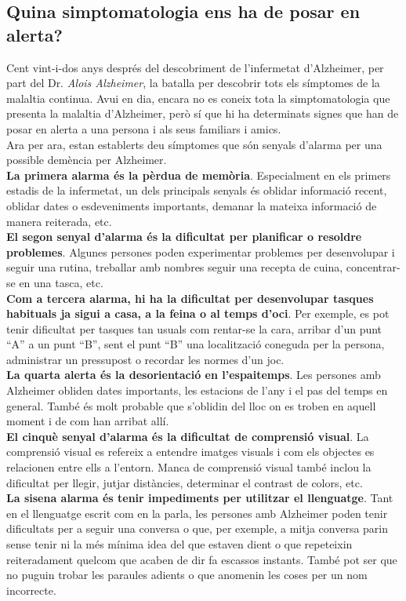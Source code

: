 \documentclass[a4paper,12pt]{article}
\begin{document}
\subsection*{Quina simptomatologia ens ha de posar en alerta?}
Cent vint-i-dos anys després del descobriment de l'infermetat d'Alzheimer, per part del Dr. \textit{Alois Alzheimer}, la batalla per descobrir tots els símptomes de la malaltia continua. Avui en dia, encara no es coneix tota la simptomatologia que presenta la malaltia d'Alzheimer, però sí que hi ha determinats signes que han de posar en alerta a una persona i als seus familiars i amics.\\
Ara per ara, estan establerts deu símptomes que són senyals d'alarma per una possible demència per Alzheimer.\\
\textbf{La primera alarma és la pèrdua de memòria}. Especialment en els primers estadis de la infermetat, un dels principals senyals és oblidar informació recent, oblidar dates o esdeveniments importants, demanar la mateixa informació de manera reiterada, etc.\\
\textbf{El segon senyal d'alarma és la dificultat per planificar o resoldre problemes}. Algunes persones poden experimentar problemes per desenvolupar i seguir una rutina, treballar amb nombres seguir una recepta de cuina, concentrar-se en una tasca, etc.\\
\textbf{Com a tercera alarma, hi ha la dificultat per desenvolupar tasques habituals ja sigui a casa, a la feina o al temps d'oci}. Per exemple, es pot tenir dificultat per tasques tan usuals com rentar-se la cara, arribar d'un punt “A” a un punt “B”, sent el punt “B” una localització coneguda per la persona, administrar un pressupost o recordar les normes d'un joc.\\
\textbf{La quarta alerta és la desorientació en l'espaitemps}. Les persones amb Alzheimer obliden dates importants, les estacions de l'any i el pas del temps en general. També és molt probable que s'oblidin del lloc on es troben en aquell moment i de com han arribat allí.\\
\textbf{El cinquè senyal d'alarma és la dificultat de comprensió visual}. La comprensió visual es refereix a entendre imatges visuals i com els objectes es relacionen entre ells a l'entorn. Manca de comprensió visual també inclou la dificultat per llegir, jutjar distàncies, determinar el contrast de colors, etc.\\
\textbf{La sisena alarma és tenir impediments per utilitzar el llenguatge}. Tant en el llenguatge escrit com en la parla, les persones amb Alzheimer poden tenir dificultats per a seguir una conversa o que, per exemple, a mitja conversa parin sense tenir ni la més mínima idea del que estaven dient o que repeteixin reiteradament quelcom que acaben de dir fa escassos instants. També pot ser que no puguin trobar les paraules adients o que anomenin les coses per un nom incorrecte.\\
\end{document}
